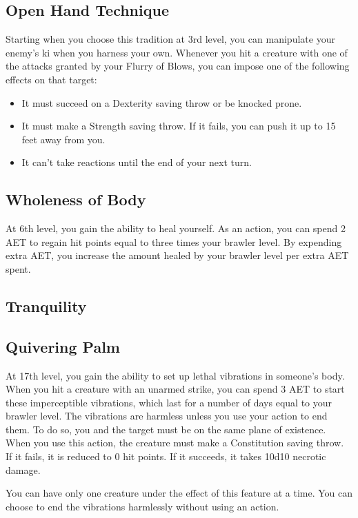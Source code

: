 \subsection{Open Hand Technique}

Starting when you choose this tradition at 3rd level, you can manipulate your enemy's ki when you harness your own. Whenever you hit a creature with one of the attacks granted by your Flurry of Blows, you can impose one of the following effects on that target:
\begin{itemize}
\item It must succeed on a Dexterity saving throw or be knocked prone.
\item It must make a Strength saving throw. If it fails, you can push it up to 15 feet away from you.
\item It can't take reactions until the end of your next turn.
\end{itemize}

\subsection{Wholeness of Body}

At 6th level, you gain the ability to heal yourself. As an action, you can spend 2 AET to regain hit points equal to three times your brawler level. By expending extra AET, you increase the amount healed by your brawler level per extra AET spent.

\subsection{Tranquility}


\subsection{Quivering Palm}

At 17th level, you gain the ability to set up lethal vibrations in someone's body. When you hit a creature with an unarmed strike, you can spend 3 AET to start these imperceptible vibrations, which last for a number of days equal to your brawler level. The vibrations are harmless unless you use your action to end them. To do so, you and the target must be on the same plane of existence. When you use this action, the creature must make a Constitution saving throw. If it fails, it is reduced to 0 hit points. If it succeeds, it takes 10d10 necrotic damage.

You can have only one creature under the effect of this feature at a time. You can choose to end the vibrations harmlessly without using an action.